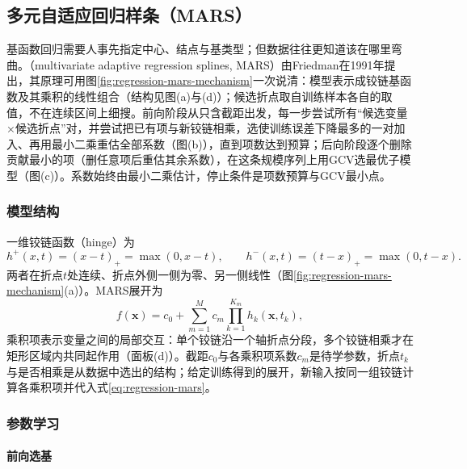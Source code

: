 \subsection{多元自适应回归样条（MARS）}
\label{sec:regression-mars}

基函数回归需要人事先指定中心、结点与基类型；但数据往往更知道该在哪里弯曲。（multivariate adaptive regression splines, MARS）由Friedman在1991年提出，其原理可用图\ref{fig:regression-mars-mechanism}一次说清：模型表示成铰链基函数及其乘积的线性组合（结构见图(a)与(d)）；候选折点取自训练样本各自的取值，不在连续区间上细搜。前向阶段从只含截距出发，每一步尝试所有“候选变量×候选折点”对，并尝试把已有项与新铰链相乘，选使训练误差下降最多的一对加入、再用最小二乘重估全部系数（图(b)），直到项数达到预算；后向阶段逐个删除贡献最小的项（删任意项后重估其余系数），在这条规模序列上用GCV选最优子模型（图(c)）。系数始终由最小二乘估计，停止条件是项数预算与GCV最小点。

\subsubsection{模型结构}
\label{sec:regression-mars-structure}

一维铰链函数（hinge）为
\[
  h^+(x,t)=(x-t)_+=\max(0,x-t),
  \qquad
  h^-(x,t)=(t-x)_+=\max(0,t-x).
\]
两者在折点$t$处连续、折点外侧一侧为零、另一侧线性（图\ref{fig:regression-mars-mechanism}(a)）。MARS展开为
\begin{equation}
  f(\bm{x})=c_0+\sum_{m=1}^M c_m\prod_{k=1}^{K_m}h_{k}(\bm{x},t_{k}),
  \label{eq:regression-mars}
\end{equation}
乘积项表示变量之间的局部交互：单个铰链沿一个轴折点分段，多个铰链相乘才在矩形区域内共同起作用（面板(d)）。截距$c_0$与各乘积项系数$c_m$是待学参数，折点$t_k$与是否相乘是从数据中选出的结构；给定训练得到的展开，新输入按同一组铰链计算各乘积项并代入式\eqref{eq:regression-mars}。

\subsubsection{参数学习}
\label{sec:regression-mars-learning}

\paragraph{前向选基}

